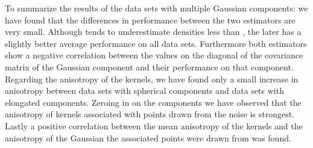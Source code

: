 	To summarize the results of the data sets with multiple Gaussian components: we have found that the differences in performance between the two estimators are very small. Although \sambe tends to underestimate densities less than \mbe, the later has a slightly better average performance on all data sets.
	Furthermore both estimators show a negative correlation between the values on the diagonal of the covariance matrix of the Gaussian component and their performance on that component.
	Regarding the anisotropy of the kernels, we have found only a small increase in anisotropy between data sets with spherical components and data sets with elongated components. 
	Zeroing in on the components we have observed that the anisotropy of kernels associated with points drawn from the noise is strongest.
	Lastly a positive correlation between the mean anisotropy of the kernels and the anisotropy of the Gaussian the associated points were drawn from was found. 